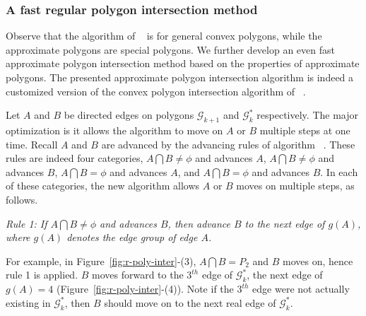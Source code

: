 
\subsubsection{A fast regular polygon intersection method}


Observe that the algorithm of ~\cite{ORourke:Intersection} is for general convex polygons, while the approximate polygons are special polygons. We further develop an even fast approximate polygon intersection method based on the properties of approximate polygons.
%
The presented approximate polygon intersection algorithm is indeed a customized version of the convex polygon intersection algorithm of ~\cite{ORourke:Intersection}.

Let $A$ and $B$ be directed edges on polygons $\mathcal{G}_{k+1}$ and $\mathcal{G}^*_k$ respectively. The major optimization is it allows the algorithm to move on $A$ or $B$ multiple steps at one time.
Recall $A$ and $B$ are advanced by the advancing rules of algorithm ~\cite{ORourke:Intersection}.
These rules are indeed four categories, \ie $A \bigcap B \ne \phi$ and advances $A$, $A \bigcap B \ne \phi$ and advances $B$, $A \bigcap B = \phi$ and advances $A$, and $A \bigcap B = \phi$ and advances $B$.
%
In each of these categories, the new algorithm allows $A$ or $B$ moves on multiple steps, as follows.


\sstab \emph{Rule 1: 
If $A \bigcap B \ne \phi$ and advances $B$, then advance $B$ to \textcolor[rgb]{1.00,0.00,0.00}{the next edge }of $g(A)$, where $g(A)$ denotes the edge group of edge $A$.}

For example, in Figure~\ref{fig:r-poly-inter}-(3), $A \bigcap B = P_2$ and $B$ moves on, hence rule 1 is applied. $B$ moves forward to the $3^{th}$ edge of $\mathcal{G}^*_k$, \ie the next edge of $g(A) = 4$ (Figure~\ref{fig:r-poly-inter}-(4)).
Note if the $3^{th}$ edge were not actually existing in $\mathcal{G}^*_k$, then $B$ should move on to the next real edge of $\mathcal{G}^*_k$.



